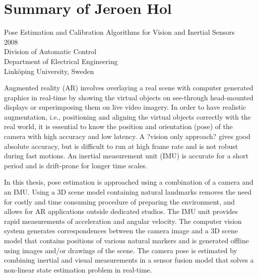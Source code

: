 


\section{Summary of Jeroen Hol \cite{hol2008}}

Pose Estimation and Calibration Algorithms for Vision and Inertial Sensors \\  2008 \\  Division of Automatic Control \\  Department of Electrical Engineering \\  Link{\"o}ping University, Sweden

Augmented reality (AR) involves overlaying a real scene with computer generated graphics in real-time by showing the virtual objects on see-through head-mounted displays or superimposing them on live video imagery. In order to have realistic augmentation, i.e.,  positioning and aligning the virtual objects correctly with the real world, it is essential to know the position and orientation (pose) of the camera with high accuracy and low latency. A ?vision only approach? gives good absolute accuracy, but is difficult to run at high frame rate and is not robust during fast motions. An  inertial measurement unit (IMU) is accurate for a short period and is drift-prone for longer time scales. 

In this thesis, pose estimation is approached using a combination of a camera and an IMU. Using a 3D scene model containing natural landmarks removes the need for costly and time consuming procedure of preparing the environment, and allows for AR applications outside dedicated studios. The IMU unit provides rapid measurements of acceleration and angular velocity. The computer vision system generates correspondences between the camera image and a 3D scene model that contains positions of various natural markers and is generated offline using images and/or drawings of the scene. The camera pose is estimated by combining inertial and visual measurements in a sensor fusion model that solves a non-linear state estimation problem in real-time.

